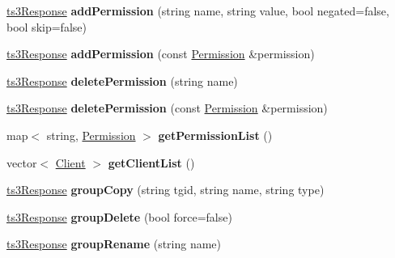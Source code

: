 \begin{DoxyCompactItemize}
\item 
\hyperlink{struct_ts3_api_1_1ts3_response}{ts3\+Response} {\bfseries add\+Permission} (string name, string value, bool negated=false, bool skip=false)\hypertarget{class_ts3_api_1_1_group_a4289f37b51c8d5d18d1e5e72870760ca}{}\label{class_ts3_api_1_1_group_a4289f37b51c8d5d18d1e5e72870760ca}

\item 
\hyperlink{struct_ts3_api_1_1ts3_response}{ts3\+Response} {\bfseries add\+Permission} (const \hyperlink{class_ts3_api_1_1_permission}{Permission} \&permission)\hypertarget{class_ts3_api_1_1_group_a3ae23419bd64611d23e8f94b4c381f28}{}\label{class_ts3_api_1_1_group_a3ae23419bd64611d23e8f94b4c381f28}

\item 
\hyperlink{struct_ts3_api_1_1ts3_response}{ts3\+Response} {\bfseries delete\+Permission} (string name)\hypertarget{class_ts3_api_1_1_group_a0480ce416aab3341fa8277612494f39a}{}\label{class_ts3_api_1_1_group_a0480ce416aab3341fa8277612494f39a}

\item 
\hyperlink{struct_ts3_api_1_1ts3_response}{ts3\+Response} {\bfseries delete\+Permission} (const \hyperlink{class_ts3_api_1_1_permission}{Permission} \&permission)\hypertarget{class_ts3_api_1_1_group_a1184de4759eed32e05b3d74ea8e57bae}{}\label{class_ts3_api_1_1_group_a1184de4759eed32e05b3d74ea8e57bae}

\item 
map$<$ string, \hyperlink{class_ts3_api_1_1_permission}{Permission} $>$ {\bfseries get\+Permission\+List} ()\hypertarget{class_ts3_api_1_1_group_ae8bf50dc322f3b246a231533f6175b2f}{}\label{class_ts3_api_1_1_group_ae8bf50dc322f3b246a231533f6175b2f}

\item 
vector$<$ \hyperlink{class_ts3_api_1_1_client}{Client} $>$ {\bfseries get\+Client\+List} ()\hypertarget{class_ts3_api_1_1_group_a7e622d8f5f4cb60142d3bdfd6e56dc02}{}\label{class_ts3_api_1_1_group_a7e622d8f5f4cb60142d3bdfd6e56dc02}

\item 
\hyperlink{struct_ts3_api_1_1ts3_response}{ts3\+Response} {\bfseries group\+Copy} (string tgid, string name, string type)\hypertarget{class_ts3_api_1_1_group_a3d84990139842279576b267404eaa2e4}{}\label{class_ts3_api_1_1_group_a3d84990139842279576b267404eaa2e4}

\item 
\hyperlink{struct_ts3_api_1_1ts3_response}{ts3\+Response} {\bfseries group\+Delete} (bool force=false)\hypertarget{class_ts3_api_1_1_group_a93f76fca6fa2ac41768e119cac191d93}{}\label{class_ts3_api_1_1_group_a93f76fca6fa2ac41768e119cac191d93}

\item 
\hyperlink{struct_ts3_api_1_1ts3_response}{ts3\+Response} {\bfseries group\+Rename} (string name)\hypertarget{class_ts3_api_1_1_group_aa78c458c7fbb6e940c7d017adcafdefe}{}\label{class_ts3_api_1_1_group_aa78c458c7fbb6e940c7d017adcafdefe}

\end{DoxyCompactItemize}
